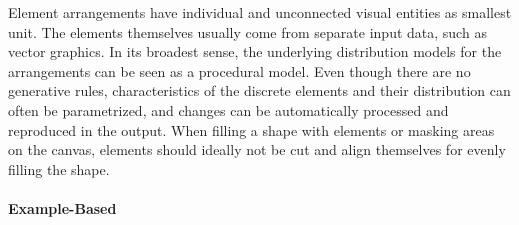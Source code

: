 Element arrangements have individual and unconnected visual entities as smallest unit. The elements themselves usually come from separate input data, such as vector graphics. In its broadest sense, the underlying distribution models for the arrangements can be seen as a procedural model. Even though there are no generative rules, characteristics of the discrete elements and their distribution can often be parametrized, and changes can be automatically processed and reproduced in the output. When filling a shape with elements or masking areas on the canvas, elements should ideally not be cut and align themselves for evenly filling the shape.

\paragraph*{Example-Based}
\label{para:analysis_element_arrangements_example}


